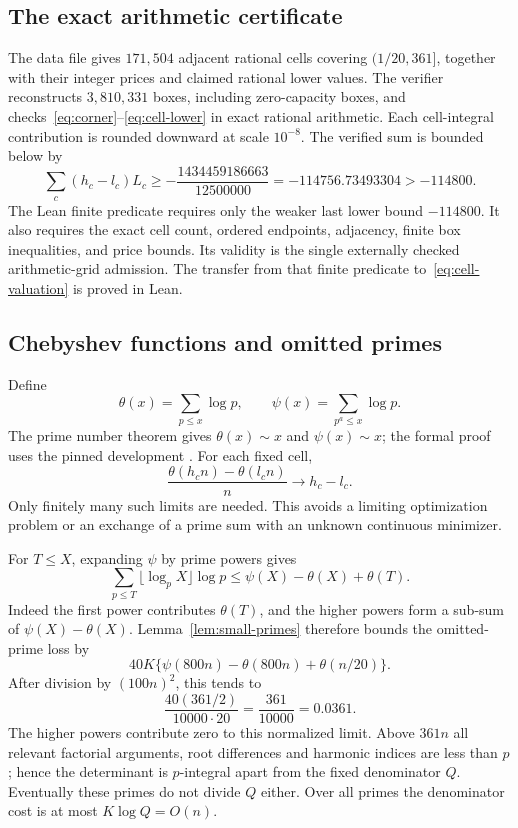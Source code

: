 \subsection{The exact arithmetic certificate}
The data file  gives
$171{,}504$ adjacent rational cells covering $(1/20,361]$, together with
their integer prices and claimed rational lower values. The verifier
reconstructs $3{,}810{,}331$ boxes, including zero-capacity boxes, and
checks~\eqref{eq:corner}--\eqref{eq:cell-lower} in exact rational arithmetic.
Each cell-integral contribution is rounded downward at scale $10^{-8}$.
The verified sum is bounded below by
\begin{equation}\label{eq:padic-cert}
 \sum_c(h_c-l_c)L_c\ge
 -\frac{1434459186663}{12500000}
 =-114756.73493304>-114800.
\end{equation}
The Lean finite predicate requires only the weaker last lower bound
$-114800$. It also requires the exact cell count, ordered endpoints,
adjacency, finite box inequalities, and price bounds.
Its validity is the single externally checked arithmetic-grid admission.
The transfer from that finite predicate to~\eqref{eq:cell-valuation} is
proved in Lean.

\subsection{Chebyshev functions and omitted primes}
Define
\[
 \theta(x)=\sum_{p\le x}\log p,\qquad
 \psi(x)=\sum_{p^a\le x}\log p.
\]
The prime number theorem gives $\theta(x)\sim x$ and $\psi(x)\sim x$;
the formal proof uses the pinned development \cite{PNT}. For each fixed
cell,
\[
 \frac{\theta(h_cn)-\theta(l_cn)}n\longrightarrow h_c-l_c.
\]
Only finitely many such limits are needed. This avoids a limiting
optimization problem or an exchange of a prime sum with an unknown
continuous minimizer.

For $T\le X$, expanding $\psi$ by prime powers gives
\begin{equation}\label{eq:omitted-primes}
 \sum_{p\le T}\lfloor\log_pX\rfloor\log p
 \le\psi(X)-\theta(X)+\theta(T).
\end{equation}
Indeed the first power contributes $\theta(T)$, and the higher powers
form a sub-sum of $\psi(X)-\theta(X)$. Lemma~\ref{lem:small-primes}
therefore bounds the omitted-prime loss by
\[
 40K\{\psi(800n)-\theta(800n)+\theta(n/20)\}.
\]
After division by $(100n)^2$, this tends to
\begin{equation}\label{eq:small-allowance}
 \frac{40(361/2)}{10000\cdot20}=\frac{361}{10000}=0.0361.
\end{equation}
The higher powers contribute zero to this normalized limit. Above $361n$
all relevant factorial arguments, root differences and harmonic indices
are less than $p$; hence the determinant is $p$-integral apart from the
fixed denominator $Q$. Eventually these primes do not divide $Q$ either.
Over all primes the denominator cost is at most $K\log Q=O(n)$.

